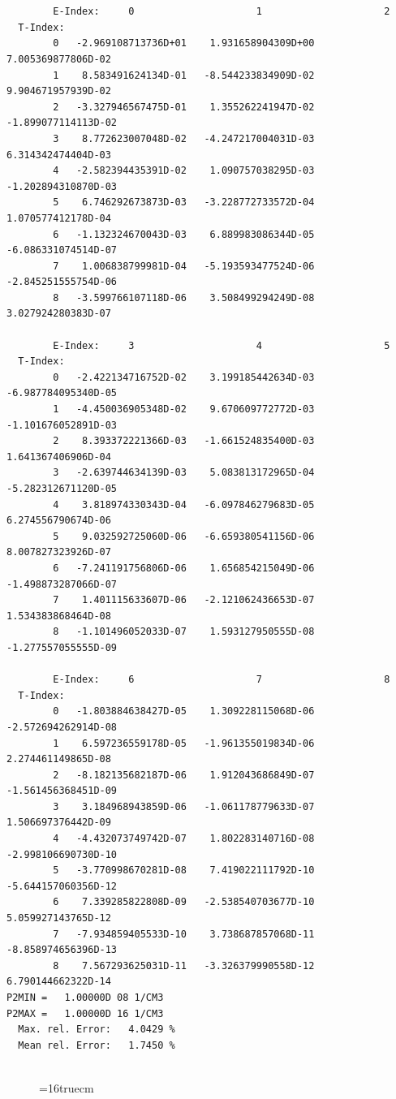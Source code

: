 \documentclass[12pt,dvipdfmx]{article}
\begin{document}
\begin{small}\begin{verbatim}


        E-Index:     0                     1                     2
  T-Index:
        0   -2.969108713736D+01    1.931658904309D+00    7.005369877806D-02
        1    8.583491624134D-01   -8.544233834909D-02    9.904671957939D-02
        2   -3.327946567475D-01    1.355262241947D-02   -1.899077114113D-02
        3    8.772623007048D-02   -4.247217004031D-03    6.314342474404D-03
        4   -2.582394435391D-02    1.090757038295D-03   -1.202894310870D-03
        5    6.746292673873D-03   -3.228772733572D-04    1.070577412178D-04
        6   -1.132324670043D-03    6.889983086344D-05   -6.086331074514D-07
        7    1.006838799981D-04   -5.193593477524D-06   -2.845251555754D-06
        8   -3.599766107118D-06    3.508499294249D-08    3.027924280383D-07

        E-Index:     3                     4                     5
  T-Index:
        0   -2.422134716752D-02    3.199185442634D-03   -6.987784095340D-05
        1   -4.450036905348D-02    9.670609772772D-03   -1.101676052891D-03
        2    8.393372221366D-03   -1.661524835400D-03    1.641367406906D-04
        3   -2.639744634139D-03    5.083813172965D-04   -5.282312671120D-05
        4    3.818974330343D-04   -6.097846279683D-05    6.274556790674D-06
        5    9.032592725060D-06   -6.659380541156D-06    8.007827323926D-07
        6   -7.241191756806D-06    1.656854215049D-06   -1.498873287066D-07
        7    1.401115633607D-06   -2.121062436653D-07    1.534383868464D-08
        8   -1.101496052033D-07    1.593127950555D-08   -1.277557055555D-09

        E-Index:     6                     7                     8
  T-Index:
        0   -1.803884638427D-05    1.309228115068D-06   -2.572694262914D-08
        1    6.597236559178D-05   -1.961355019834D-06    2.274461149865D-08
        2   -8.182135682187D-06    1.912043686849D-07   -1.561456368451D-09
        3    3.184968943859D-06   -1.061178779633D-07    1.506697376442D-09
        4   -4.432073749742D-07    1.802283140716D-08   -2.998106690730D-10
        5   -3.770998670281D-08    7.419022111792D-10   -5.644157060356D-12
        6    7.339285822808D-09   -2.538540703677D-10    5.059927143765D-12
        7   -7.934859405533D-10    3.738687857068D-11   -8.858974656396D-13
        8    7.567293625031D-11   -3.326379990558D-12    6.790144662322D-14
P2MIN =   1.00000D 08 1/CM3
P2MAX =   1.00000D 16 1/CM3
  Max. rel. Error:   4.0429 %
  Mean rel. Error:   1.7450 %


\end{verbatim}\end{small}
\begin{figure} \label{7.2c}
\epsfxsize=16truecm
\end{figure}
\newpage
\end{document}
